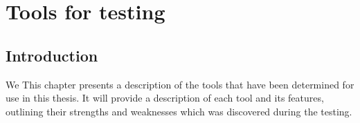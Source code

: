 \chapter{Tools for testing}

\section{Introduction}
We This chapter presents a description of the tools that have been determined for use in this thesis. It will provide a description of each tool and its features, outlining their strengths and weaknesses which was discovered during the testing.  



